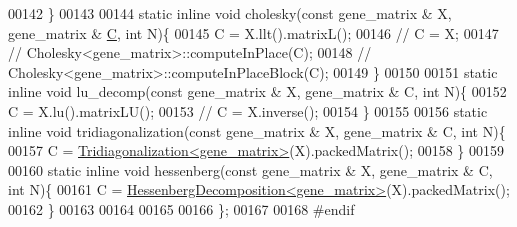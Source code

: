 \begin{DoxyCode}
00142   \}
00143 
00144   \textcolor{keyword}{static} \textcolor{keyword}{inline} \textcolor{keywordtype}{void} cholesky(\textcolor{keyword}{const} gene\_matrix & X, gene\_matrix & \hyperlink{group___core___module}{C}, \textcolor{keywordtype}{int} N)\{
00145     C = X.llt().matrixL();
00146 \textcolor{comment}{//     C = X;}
00147 \textcolor{comment}{//     Cholesky<gene\_matrix>::computeInPlace(C);}
00148 \textcolor{comment}{//     Cholesky<gene\_matrix>::computeInPlaceBlock(C);}
00149   \}
00150 
00151   \textcolor{keyword}{static} \textcolor{keyword}{inline} \textcolor{keywordtype}{void} lu\_decomp(\textcolor{keyword}{const} gene\_matrix & X, gene\_matrix & C, \textcolor{keywordtype}{int} N)\{
00152     C = X.lu().matrixLU();
00153 \textcolor{comment}{//     C = X.inverse();}
00154   \}
00155 
00156   \textcolor{keyword}{static} \textcolor{keyword}{inline} \textcolor{keywordtype}{void} tridiagonalization(\textcolor{keyword}{const} gene\_matrix & X, gene\_matrix & C, \textcolor{keywordtype}{int} N)\{
00157     C = \hyperlink{group___eigenvalues___module_class_eigen_1_1_tridiagonalization}{Tridiagonalization<gene\_matrix>}(X).packedMatrix();
00158   \}
00159 
00160   \textcolor{keyword}{static} \textcolor{keyword}{inline} \textcolor{keywordtype}{void} hessenberg(\textcolor{keyword}{const} gene\_matrix & X, gene\_matrix & C, \textcolor{keywordtype}{int} N)\{
00161     C = \hyperlink{group___eigenvalues___module_class_eigen_1_1_hessenberg_decomposition}{HessenbergDecomposition<gene\_matrix>}(X).packedMatrix();
00162   \}
00163 
00164 
00165 
00166 \};
00167 
00168 \textcolor{preprocessor}{#endif}
\end{DoxyCode}

